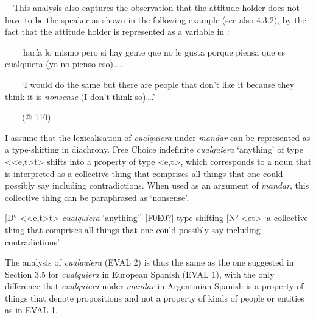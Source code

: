 \begin{styleStandard}
\ \ This analysis also captures the observation that the attitude holder does not have to be the speaker as shown in the following example (see also 4.3.2), by the fact that the attitude holder is represented as a variable in :
\end{styleStandard}

\begin{styleStandard}
\textbf{\ \ }\ \ haría lo mismo pero si hay gente que no le gusta porque piensa que es cualquiera (yo no pienso eso).....
\end{styleStandard}

\begin{styleStandard}
\ \ \ \ ‘I would do the same but there are people that don’t like it because they think it is \textit{nonsense} (I don’t think so)….’
\end{styleStandard}

\begin{styleStandard}
\ \ \ \ (@ 110)
\end{styleStandard}

\begin{styleStandard}
I assume that the lexicalisation of \textit{cualquiera} under \textit{mandar} can be represented as a type-shifting in diachrony. Free Choice indefinite \textit{cualquiera} ‘anything’ of type {\textless}{\textless}e,t{\textgreater}t{\textgreater} shifts into a property of type {\textless}e,t{\textgreater}, which corresponds to a noun that is interpreted as a collective thing that comprises all things that one could possibly say including contradictions. When used as an argument of \textit{mandar}, this collective thing can be paraphrased as ‘nonsense’.
\end{styleStandard}


\setcounter{listWWNumxleveli}{0}
\begin{listWWNumxleveli}
\item 
\begin{styleListParagraph}
\textmd{[D° {\textless}{\textless}e,t{\textgreater}t{\textgreater} }\textmd{\textit{cualquiera}}\textmd{ ‘anything’] [F0E0?] type-shifting [N° {\textless}et{\textgreater} ‘a collective thing that comprises all things that one could possibly say including contradictions’}
\end{styleListParagraph}
\end{listWWNumxleveli}
\begin{styleStandard}
The analysis of \textit{cualquiera} (EVAL 2) is thus the same as the one suggested in Section 3.5 for \textit{cualquiera} in European Spanish (EVAL 1), with the only difference that \textit{cualquiera} under \textit{mandar} in Argentinian Spanish is a property of things that denote propositions and not a property of kinds of people or entities as in EVAL 1. \ 
\end{styleStandard}

